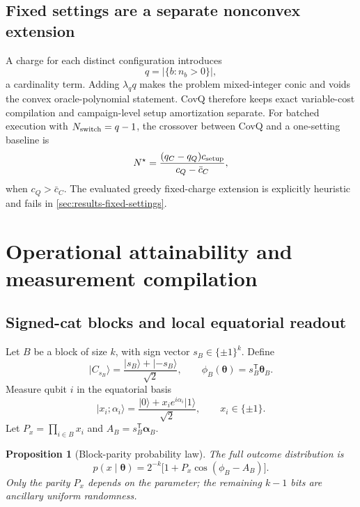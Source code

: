 \documentclass[11pt]{article}
\newtheorem{proposition}[proposition]{Proposition}
\theoremstyle{definition}
\theoremstyle{remark}
\newcommand{\ket}[1]{\lvert #1\rangle}
\begin{document}
\subsection{Fixed settings are a separate nonconvex extension}
A charge for each distinct configuration introduces
\begin{equation}
  q=|\{b:n_b>0\}|,
\end{equation}
a cardinality term. Adding $\lambda_q q$ makes the problem mixed-integer conic and voids the convex oracle-polynomial statement. CovQ therefore keeps exact variable-cost compilation and campaign-level setup amortization separate. For batched execution with $N_{\rm switch}=q-1$, the crossover between CovQ and a one-setting baseline is
\begin{equation}
  N^\star=
  \frac{(q_C-q_Q)c_{\rm setup}}{c_Q-\bar c_C},
  \label{eq:setting-crossover}
\end{equation}
when $c_Q>\bar c_C$. The evaluated greedy fixed-charge extension is explicitly heuristic and fails in \cref{sec:results-fixed-settings}.

\section{Operational attainability and measurement compilation}

\subsection{Signed-cat blocks and local equatorial readout}
Let $B$ be a block of size $k$, with sign vector $s_B\in\{\pm1\}^k$. Define
\begin{equation}
  \ket{C_{s_B}}=\frac{\ket{s_B}+\ket{-s_B}}{\sqrt2},
  \qquad
  \phi_B(\bm\theta)=s_B^{\mathsf T}\bm\theta_B.
  \label{eq:block-cat-phase}
\end{equation}
Measure qubit $i$ in the equatorial basis
\begin{equation}
  \ket{x_i;\alpha_i}=\frac{\ket0+x_i e^{i\alpha_i}\ket1}{\sqrt2},
  \qquad x_i\in\{\pm1\}.
\end{equation}
Let $P_x=\prod_{i\in B}x_i$ and $A_B=s_B^{\mathsf T}\bm\alpha_B$.

\begin{proposition}[Block-parity probability law]
\label{prop:block-parity-law}
The full outcome distribution is
\begin{equation}
  p(x\mid\bm\theta)=2^{-k}\bigl[1+P_x\cos(\phi_B-A_B)\bigr].
  \label{eq:block-parity-law}
\end{equation}
Only the parity $P_x$ depends on the parameter; the remaining $k-1$ bits are ancillary uniform randomness.
\end{proposition}
\end{document}
